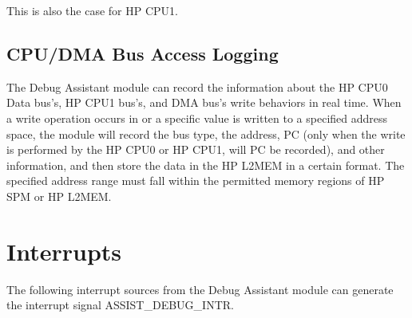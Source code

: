 \documentclass[main\_\_EN.tex]{subfiles}
\begin{document}
This is also the case for HP CPU1.

\subsection{CPU/DMA Bus Access Logging}

The Debug Assistant module can record the information about the HP CPU0 Data bus's, HP CPU1 bus's, and DMA bus's write behaviors in real time. When a write operation occurs in or a specific value is written to a specified address space, the module will record the bus type, the address, PC (only when the write is performed by the HP CPU0 or HP CPU1, will PC be recorded), and other information, and then store the data in the HP L2MEM in a certain format. The specified address range must fall within the permitted memory regions of HP SPM or HP L2MEM.



\section{Interrupts}
\label{sec:dbgassist-interrupts}

The following interrupt sources from the Debug Assistant module can generate the interrupt signal ASSIST\_DEBUG\_INTR.
\end{document}
